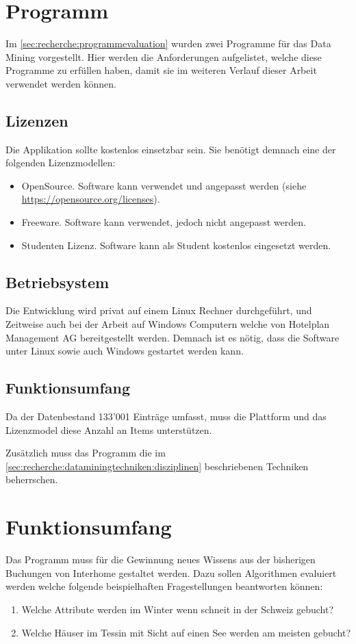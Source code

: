 \section{Programm}
\label{sec:anforderungsanalyse:programm}
Im \cref{sec:recherche:programmevaluation} wurden zwei Programme für das Data Mining vorgestellt. Hier werden die Anforderungen aufgelistet, welche diese Programme zu erfüllen haben, damit sie im weiteren Verlauf dieser Arbeit verwendet werden können.

\subsection{Lizenzen}
\label{sec:anforderungsanalyse:programm:lizenzen}
Die Applikation sollte kostenlos einsetzbar sein. Sie benötigt demnach eine der folgenden Lizenzmodellen:
\begin{itemize}
\item OpenSource. Software kann verwendet und angepasst werden (siehe \url{https://opensource.org/licenses}).
\item Freeware. Software kann verwendet, jedoch nicht angepasst werden.
\item Studenten Lizenz. Software kann als Student kostenlos eingesetzt werden.
\end{itemize}

\subsection{Betriebsystem}
\label{sec:anforderungsanalyse:programm:betriebsystem}
Die Entwicklung wird privat auf einem Linux Rechner durchgeführt, und Zeitweise auch bei der Arbeit auf Windows Computern welche von Hotelplan Management AG bereitgestellt werden.
Demnach ist es nötig, dass die Software unter Linux sowie auch Windows gestartet werden kann.

\subsection{Funktionsumfang}
\label{sec:anforderungsanalyse:programm:funktionsumfang}
Da der Datenbestand 133'001 Einträge umfasst, muss die Plattform und das Lizenzmodel diese Anzahl an Items unterstützen.

Zusätzlich muss das Programm die im \cref{sec:recherche:dataminingtechniken:disziplinen}  beschriebenen Techniken beherrschen.

\section{Funktionsumfang}
Das Programm muss für die Gewinnung neues Wissens aus der bisherigen Buchungen von Interhome gestaltet werden. Dazu sollen Algorithmen evaluiert werden welche folgende beispielhaften Fragestellungen beantworten können:
\begin{enumerate}
\item Welche Attribute werden im Winter wenn schneit in der Schweiz gebucht?
\item Welche Häuser im Tessin mit Sicht auf einen See werden am meisten gebucht?
\end{enumerate}

